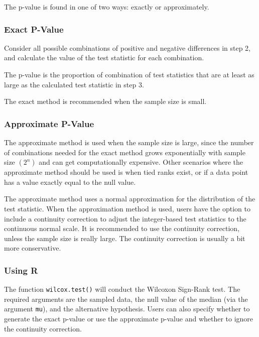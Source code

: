\documentclass[
]{book}
\theoremstyle{definition}
\theoremstyle{definition}
\theoremstyle{definition}
\theoremstyle{definition}
\theoremstyle{remark}
\begin{document}
The p-value is found in one of two ways: exactly or approximately.

\hypertarget{exact-p-value}{%
\subsubsection{Exact P-Value}\label{exact-p-value}}

Consider all possible combinations of positive and negative differences in step 2, and calculate the value of the test statistic for each combination.

The p-value is the proportion of combination of test statistics that are at least as large as the calculated test statistic in step 3.

The exact method is recommended when the sample size is small.

\hypertarget{approximate-p-value}{%
\subsubsection{Approximate P-Value}\label{approximate-p-value}}

The approximate method is used when the sample size is large, since the number of combinations needed for the exact method grows exponentially with sample size \((2^n)\) and can get computationally expensive. Other scenarios where the approximate method should be used is when tied ranks exist, or if a data point has a value exactly equal to the null value.

The approximate method uses a normal approximation for the distribution of the test statistic. When the approximation method is used, users have the option to include a continuity correction to adjust the integer-based test statistics to the continuous normal scale. It is recommended to use the continuity correction, unless the sample size is really large. The continuity correction is usually a bit more conservative.

\hypertarget{using-r}{%
\subsubsection{Using R}\label{using-r}}

The function \texttt{wilcox.test()} will conduct the Wilcoxon Sign-Rank test. The required arguments are the sampled data, the null value of the median (via the argument \texttt{mu}), and the alternative hypothesis. Users can also specify whether to generate the exact p-value or use the approximate p-value and whether to ignore the continuity correction.
\end{document}
